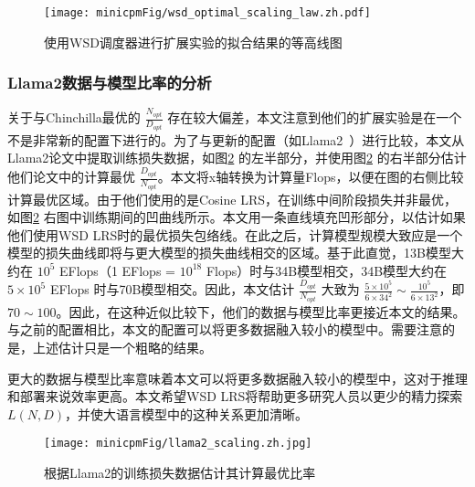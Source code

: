 \begin{figure}[!t]
    \centering
    \texttt{[image: minicpmFig/wsd\_optimal\_scaling\_law.zh.pdf]}
    \caption{使用WSD调度器进行扩展实验的拟合结果的等高线图}
    \label{fig:wsd_optimalscalinglaw_contour}
\end{figure}



\subsubsection{Llama2数据与模型比率的分析}
关于与Chinchilla最优的 $\frac{N_{opt}}{D_{opt}}$ 存在较大偏差，本文注意到他们的扩展实验是在一个不是非常新的配置下进行的。为了与更新的配置（如Llama2~\citep{touvron2023llama}）进行比较，本文从Llama2论文中提取训练损失数据，如图\ref{fig:llamascaling} 的左半部分，并使用图\ref{fig:llamascaling} 的右半部分估计他们论文中的计算最优 $\frac{D_{opt}}{N_{opt}}$。本文将x轴转换为计算量Flops，以便在图的右侧比较计算最优区域。由于他们使用的是Cosine LRS，在训练中间阶段损失并非最优，如图\ref{fig:llamascaling} 右图中训练期间的凹曲线所示。本文用一条直线填充凹形部分，以估计如果他们使用WSD LRS时的最优损失包络线。在此之后，计算模型规模大致应是一个模型的损失曲线即将与更大模型的损失曲线相交的区域。基于此直觉，13B模型大约在 $10^5$ EFlops（1 EFlops = $10^{18}$ Flops）时与34B模型相交，34B模型大约在 $5\times 10^5$ EFlops 时与70B模型相交。因此，本文估计 $\frac{D_{opt}}{N_{opt}}$ 大致为 $\frac{5\times 10^5}{6\times 34^2} \sim \frac{10^5}{6\times 13^2} $，即 $70 \sim 100$。因此，在这种近似比较下，他们的数据与模型比率更接近本文的结果。与之前的配置相比，本文的配置可以将更多数据融入较小的模型中。需要注意的是，上述估计只是一个粗略的结果。 

更大的数据与模型比率意味着本文可以将更多数据融入较小的模型中，这对于推理和部署来说效率更高。本文希望WSD LRS将帮助更多研究人员以更少的精力探索 $L(N, D)$，并使大语言模型中的这种关系更加清晰。 


\begin{figure}
    \centering
    \texttt{[image: minicpmFig/llama2\_scaling.zh.jpg]}
    \caption{根据Llama2的训练损失数据估计其计算最优比率}
    \label{fig:llamascaling}
\end{figure}




